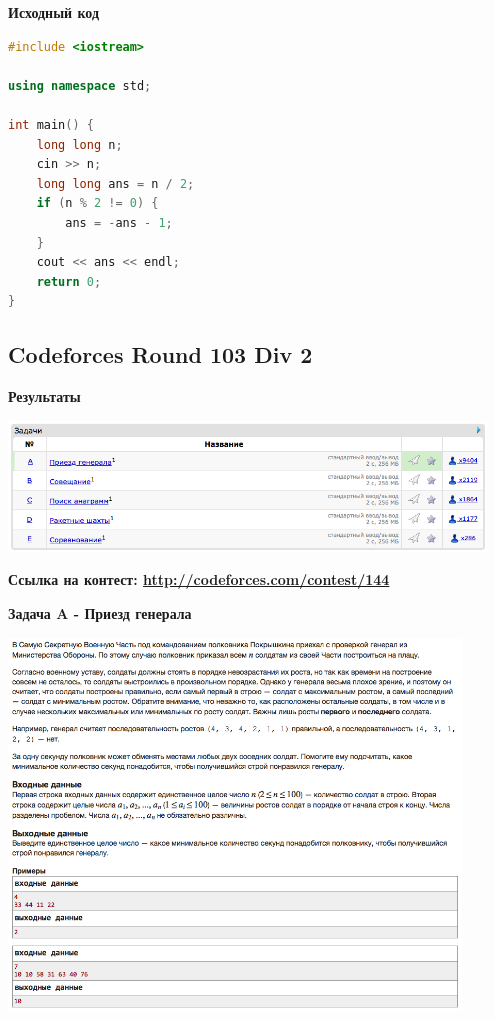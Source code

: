 \documentclass[a4paper,12pt]{article}
\begin{document}
\textbf{{\large Исходный код}} \\
\begin{lstlisting}[language=C++]
#include <iostream>

using namespace std;

int main() {
    long long n;
    cin >> n;
    long long ans = n / 2;
    if (n % 2 != 0) {
        ans = -ans - 1;
    }
    cout << ans << endl;
    return 0;
}
\end{lstlisting}




%
%

\newpage
\subsection{Codeforces Round 103 Div 2}

\textbf{{\large Результаты}} \\
\begin{center}
\includegraphics[width=0.95\textwidth]{C_103/result.png}\\ [1cm]
\end{center}

\textbf{{\large Ссылка на контест: \url{http://codeforces.com/contest/144}}}

\newpage
\textbf{{\large Задача A - Приезд генерала}}

\begin{center}
\includegraphics[width=0.9\textwidth]{C_103/A.png}\\ [1cm]
\end{center}
\end{document}

